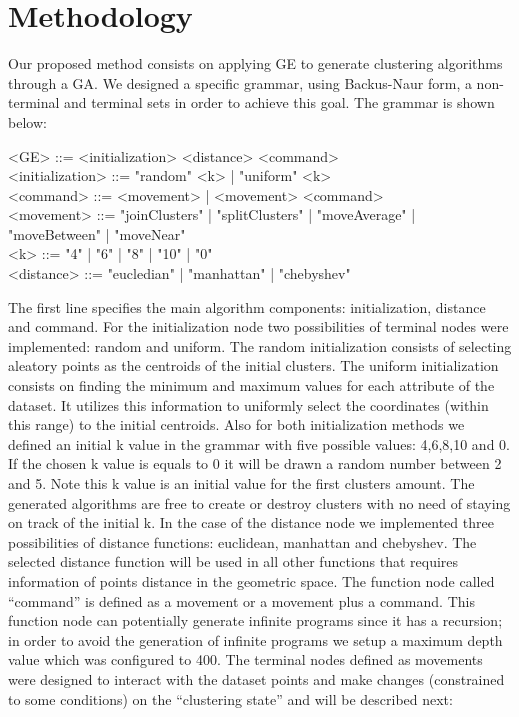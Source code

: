 \documentclass[journal]{IEEEtran}
\begin{document}
\section{Methodology}

Our proposed method consists on applying GE to generate clustering algorithms through a GA. We designed a specific grammar, using  Backus-Naur form, a non-terminal and terminal sets in order to achieve this goal. The grammar is shown below:

\begin{grammar}
	<GE> ::= <initialization> <distance> <command> 
	\\ <initialization> ::= "random" <k> | "uniform" <k>
	\\ <command> ::= <movement> | <movement> <command>
	\\ <movement> ::= "joinClusters" | "splitClusters" | "moveAverage" | "moveBetween" | "moveNear" 
	\\ <k> ::= "4" | "6" | "8" | "10" | "0"
	\\ <distance> ::= "eucledian" | "manhattan" | "chebyshev"
	\label{ge-clustering-grammar}
\end{grammar}

The first line specifies the main algorithm components: initialization, distance and command. For the initialization node two possibilities of terminal nodes were implemented: random and uniform. The random initialization consists of selecting aleatory points as the centroids of the initial clusters. The uniform initialization consists on finding the minimum and maximum values for each attribute of the dataset. It utilizes this information to uniformly select the coordinates (within this range)  to the  initial centroids. Also for both initialization methods we defined an initial k value in the grammar with five possible values: 4,6,8,10 and 0. If the chosen k value is equals to 0 it will be drawn a random number between 2 and 5. Note this k value is an initial value for the first clusters amount. The generated algorithms are free to create or destroy clusters with no need of staying on track of the initial k. In the case of the distance node we implemented three possibilities of distance functions: euclidean, manhattan and chebyshev. The selected distance function will be used in all other functions that requires information of points distance in the geometric space. The function node called “command” is defined as a movement or a movement plus a command. This function node can potentially generate infinite programs since it has a recursion; in order to avoid the generation of infinite programs we setup a maximum depth value which was configured to 400. The terminal nodes defined as movements were designed to interact with the dataset points and make changes (constrained to some conditions) on the “clustering state” and will be described next:
\end{document}
